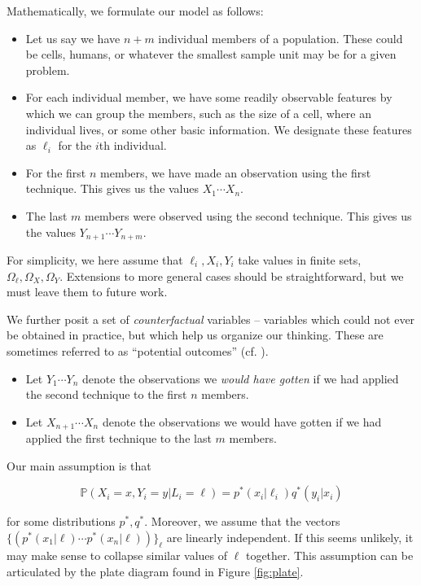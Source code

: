 Mathematically, we formulate our model as follows:

\begin{itemize}
\item Let us say we have $n+m$ individual members of a population.  These could be cells, humans, or whatever the smallest sample unit may be for a given problem.
\item For each individual member, we have some readily observable features by which we can group the members, such as the size of a cell, where an individual lives, or some other basic information.  We designate these features as $\ell_i$ for the $i$th individual.
\item For the first $n$ members, we have made an observation using the first technique.  This gives us the values $X_1 \cdots X_n$.
\item The last $m$ members were observed using the second technique.  This gives us the values $Y_{n+1} \cdots Y_{n+m}$.
\end{itemize}

For simplicity, we here assume that $\ell_i,X_i,Y_i$ take values in finite sets, $\Omega_\ell,\Omega_X,\Omega_Y$.  Extensions to more general cases should be straightforward, but we must leave them to future work.  

We further posit a set of \emph{counterfactual} variables -- variables which could not ever be obtained in practice, but which help us organize our thinking.  These are sometimes referred to as ``potential outcomes''  (cf. \cite{rubin2005causal}).

\begin{itemize}
\item Let $Y_1 \cdots Y_n$ denote the observations we \emph{would have gotten} if we had applied the second technique to the first $n$ members.
\item Let $X_{n+1} \cdots X_n$ denote the observations we would have gotten if we had applied the first technique to the last $m$ members. 
\end{itemize}

Our main assumption is that 

\begin{equation}\label{eq:mainassumption}
\mathbb{P}(X_i=x,Y_i=y|L_i=\ell)=p^*(x_i|\ell_i)q^*(y_i|x_i)
\end{equation}

for some distributions $p^*,q^*$.  Moreover, we assume that the vectors $\{(p^*(x_1|\ell)\cdots p^*(x_n|\ell))\}_\ell$ are linearly independent.  If this seems unlikely, it may make sense to collapse similar values of $\ell$ together.  This assumption can be articulated by the plate diagram found in Figure \ref{fig:plate}.

